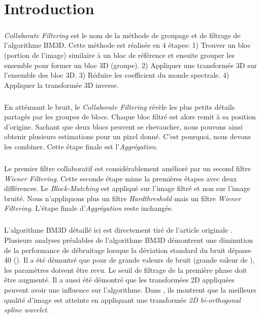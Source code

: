 \chapter{Introduction}
\paragraph{}
\textit{Collaborate Filtering} est le nom de la méthode de groupage et de filtrage de l'algorithme BM3D. Cette méthode est réalisée en 4 étapes: 1) Trouver un bloc (portion de l'image) similaire à un bloc de référence et ensuite grouper les ensemble pour former un bloc 3D (groupe). 2) Appliquer une transformée 3D sur l'ensemble des bloc 3D. 3) Réduire les coefficient du monde spectrale. 4) Appliquer la transformée 3D inverse. 
\paragraph{}
En atténuant le bruit, le \textit{Collaborate Filtering} révèle les plus petits détails partagés par les groupes de blocs. Chaque bloc filtré est alors remit à sa position d'origine. Sachant que deux blocs peuvent se chevaucher, nous pouvons ainsi obtenir plusieurs estimations pour un pixel donné. C'est pourquoi, nous devons les combiner. Cette étape finale est l'\textit{Aggrégation}.
\paragraph{}
Le premier filtre collaboratif est considérablement amélioré par un second filtre \textit{Wiener Filtering}. Cette seconde étape mime la premières étapes avec deux différences. Le \textit{Block-Matching} est appliqué sur l'image filtré et non sur l'image bruité. Nous n'appliquons plus un filtre \textit{Hardthreshold} mais un filtre \textit{Wiener Filtering}. L'étape finale d'\textit{Aggrégation} reste inchangée.
\paragraph{}
L'algorithme BM3D détaillé ici est directement tiré de l'article originale \cite{1}. Plusieurs analyses préalables de l'algorithme BM3D démontrent une diminution de la performance de débruitage lorsque la déviation standard du bruit dépasse 40 (\sigma). Il a été démontré que pour de grande valeurs de bruit (grande valeur de \sigma), les paramètres doivent être revu. Le seuil de filtrage de la première phase doit être augmenté. Il a aussi été démontré que les transformées 2D appliquées peuvent avoir une influence sur l'algorithme. Dans \cite{2}, ils montrent que la meilleurs qualité d'image est atteinte en appliquant une transformée \textit{2D bi-orthogonal spline wavelet}. 
